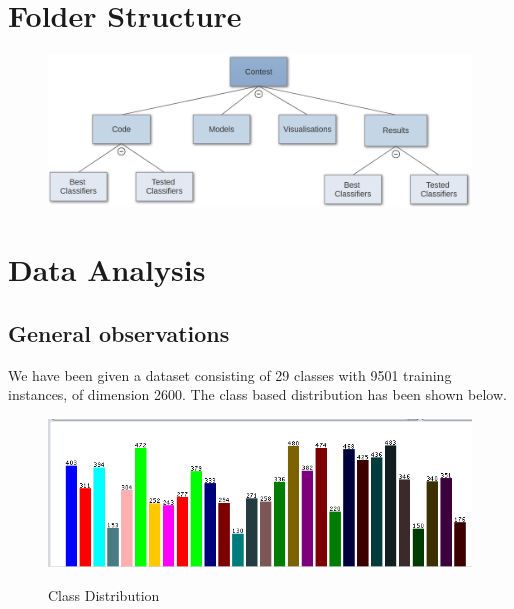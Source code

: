 \documentclass[12pt]{report}
\begin{document}
\section{Folder Structure}
\graphicspath{ {Images/} }
\begin{figure}[H]
  \centering
  \includegraphics[width=1\textwidth]{Images/flow_chart.png}\label{fig:f1}
\end{figure}


\newpage
\section{Data Analysis}
\subsection{General observations}
We have been given a dataset consisting of 29 classes with 9501 training instances, of dimension 2600. The class based distribution has been shown below.

\graphicspath{ {Images/} }
\begin{figure}[H]
  \centering
  \includegraphics[width=1\textwidth]{class_distribution.png}\label{fig:f1}
  \caption{Class Distribution}
\end{figure}
\end{document}

